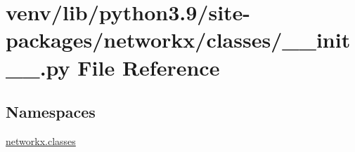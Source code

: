 \hypertarget{venv_2lib_2python3_89_2site-packages_2networkx_2classes_2____init_____8py}{}\section{venv/lib/python3.9/site-\/packages/networkx/classes/\+\_\+\+\_\+init\+\_\+\+\_\+.py File Reference}
\label{venv_2lib_2python3_89_2site-packages_2networkx_2classes_2____init_____8py}
\subsection*{Namespaces}
\begin{DoxyCompactItemize}
\item 
 \hyperlink{namespacenetworkx_1_1classes}{networkx.\+classes}
\end{DoxyCompactItemize}
